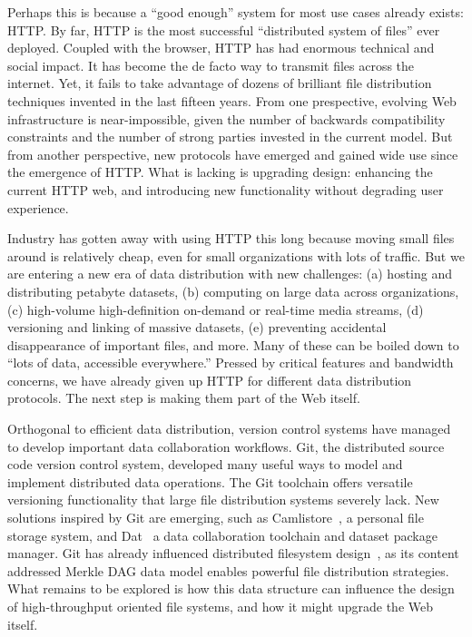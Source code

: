 \documentclass{sig-alternate}
\begin{document}
Perhaps this is because a ``good enough'' system for most use cases already exists: HTTP.  By far, HTTP is the most successful ``distributed system of files'' ever deployed. Coupled with the browser, HTTP has had enormous technical and social impact. It has become the de facto way to transmit files across the internet. Yet, it fails to take advantage of dozens of brilliant file distribution techniques invented in the last fifteen years. From one prespective, evolving Web infrastructure is near-impossible, given the number of backwards compatibility constraints and the number of strong parties invested in the current model. But from another perspective, new protocols have emerged and gained wide use since the emergence of HTTP. What is lacking is upgrading design: enhancing the current HTTP web, and introducing new functionality without degrading user experience.

Industry has gotten away with using HTTP this long because moving small files around is relatively cheap, even for small organizations with lots of traffic. But we are entering a new era of data distribution with new challenges: (a) hosting and distributing petabyte datasets, (b) computing on large data across organizations, (c) high-volume high-definition on-demand or real-time media streams, (d) versioning and linking of massive datasets, (e) preventing accidental disappearance of important files, and more. Many of these can be boiled down to ``lots of data, accessible everywhere.'' Pressed by critical features and bandwidth concerns, we have already given up HTTP for different data distribution protocols. The next step is making them part of the Web itself.

Orthogonal to efficient data distribution, version control systems have managed to develop important data collaboration workflows. Git, the distributed source code version control system, developed many useful ways to model and implement distributed data operations. The Git toolchain offers versatile versioning functionality that large file distribution systems severely lack. New solutions inspired by Git are emerging, such as Camlistore~\cite{Camlistore}, a personal file storage system, and Dat~\cite{Dat} a data collaboration toolchain and dataset package manager. Git has already influenced distributed filesystem design~\cite{mashtizadeh13}, as its content addressed Merkle DAG data model enables powerful file distribution strategies. What remains to be explored is how this data structure can influence the design of high-throughput oriented file systems, and how it might upgrade the Web itself.
\end{document}
